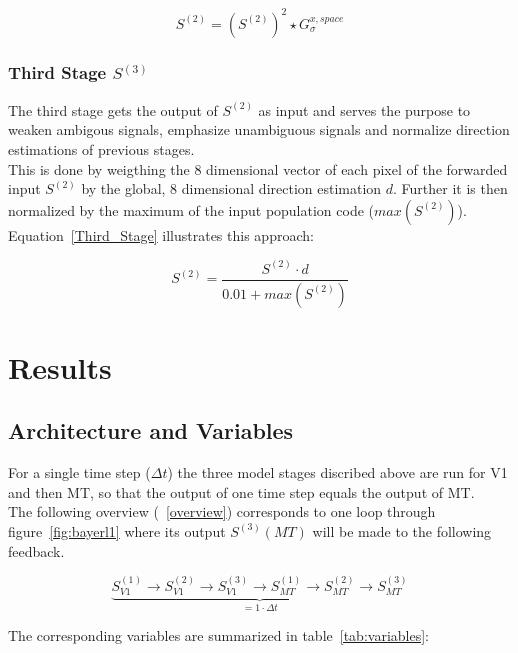 \documentclass[a4paper]{article}
\begin{document}
\begin{equation}
S^{(2)}=(S^{(2)})^{2} \star G_{\sigma}^{x,space}
\label{Second_Stage}
\end{equation}

\subsubsection{Third Stage $S^{(3)}$}
The third stage gets the output of $S^{(2)}$ as input and serves the purpose to weaken ambigous signals, emphasize unambiguous signals and normalize direction estimations of previous stages.\\
This is done by weigthing the 8 dimensional vector of each pixel of the forwarded input $S^{(2)}$ by the global, 8 dimensional direction estimation $d$. Further it is then normalized by the maximum of the input population code ($max(S^{(2)})$).\\
Equation~\eqref{Third_Stage} illustrates this approach:

\begin{equation}
S^{(2)}=\frac{S^{(2)}\cdot d}{0.01+max(S^{(2)})}
\label{Third_Stage}
\end{equation}

\section{Results}
\subsection{Architecture and Variables}
For a single time step ($\Delta t$) the three model stages discribed above are run for V1 and then MT, so that the output of one time step equals the output of MT.\\
The following overview (~\eqref{overview}) corresponds to one loop through figure~\ref{fig:bayerl1} where its output $S^{(3)}(MT)$ will be made to the following feedback.

\begin{equation}
\underbrace{S^{(1)}_{V1}\rightarrow S^{(2)}_{V1}\rightarrow S^{(3)}_{V1}\rightarrow S^{(1)}_{MT}\rightarrow S^{(2)}_{MT}\rightarrow S^{(3)}_{MT}}_{= 1 \cdot \Delta t}
\label{overview}
\end{equation}

The corresponding variables are summarized in table~\ref{tab:variables}:
\end{document}
